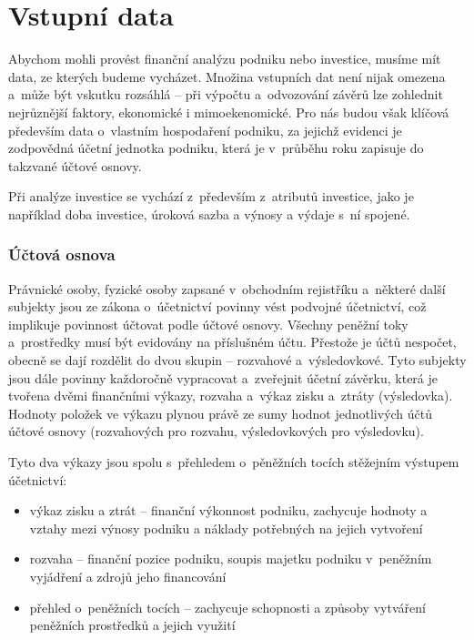 \section{Vstupní data}
Abychom mohli provést finanční analýzu podniku nebo investice, musíme mít data, ze kterých budeme vycházet. Množina vstupních dat není nijak omezena a~může být vskutku rozsáhlá -- při výpočtu a~odvozování závěrů lze zohlednit nejrůznější faktory, ekonomické i mimoekenomické. Pro nás budou však klíčová především data o~vlastním hospodaření podniku, za jejichž evidenci je zodpovědná účetní jednotka podniku, která je v~průběhu roku zapisuje do takzvané účtové osnovy. 

Při analýze investice se vychází z~především  z~atributů investice, jako je například doba investice, úroková sazba a výnosy a výdaje s~ní spojené.

\subsubsection{Účtová osnova}
Právnické osoby, fyzické osoby zapsané v~obchodním rejistříku a~některé další subjekty jsou ze zákona o~účetnictví povinny vést podvojné účetnictví, což implikuje povinnost účtovat podle účtové osnovy. Všechny peněžní toky a~prostředky musí být evidovány na příslušném účtu. Přestože je účtů nespočet, obecně se dají rozdělit do dvou skupin -- rozvahové a~výsledovkové. Tyto subjekty jsou dále povinny každoročně vypracovat a~zveřejnit účetní závěrku, která je tvořena dvěmi finančními výkazy, rozvaha a~výkaz zisku a~ztráty (výsledovka). Hodnoty položek ve výkazu plynou právě ze sumy hodnot jednotlivých účtů účtové osnovy (rozvahových pro rozvahu, výsledovkových pro výsledovku).

Tyto dva výkazy jsou spolu s~přehledem o~pěněžních tocích stěžejním výstupem účetnictví:

\begin{itemize}
	\item výkaz zisku a ztrát -- finanční výkonnost podniku, zachycuje hodnoty a vztahy mezi výnosy podniku a náklady potřebných na jejich vytvoření
	\item rozvaha -- finanční pozice podniku, soupis majetku podniku v~peněžním vyjádření a zdrojů jeho financování
	\item přehled o~peněžních tocích -- zachycuje schopnosti a způsoby vytváření peněžních prostředků a jejich využití
\end{itemize}

\pagebreak


